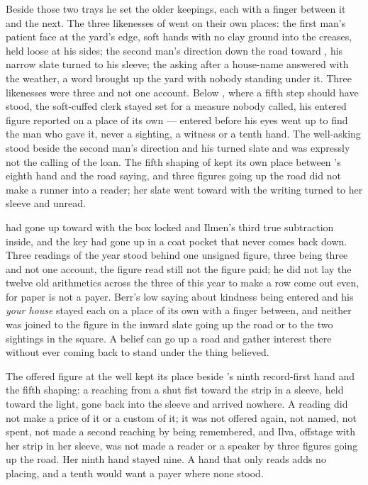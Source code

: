 Beside those two trays he set the older keepings, each with a finger between it and the next. The three likenesses of  went on their own places: the first man's patient face at the yard's edge, soft hands with no clay ground into the creases, held loose at his sides; the second man's direction down the road toward , his narrow slate turned to his sleeve; the asking after a house-name answered with the weather, a word brought up the yard with nobody standing under it. Three likenesses were three and not one account. Below , where a fifth step should have stood, the soft-cuffed clerk stayed set for a measure nobody called, his entered figure reported on a place of its own --- entered before his eyes went up to find the man who gave it, never a sighting, a witness or a tenth hand. The well-asking stood beside the second man's direction and his turned slate and was expressly not the calling of the loan. The fifth shaping of  kept its own place between 's eighth hand and the road saying, and three figures going up the road did not make a runner into a reader; her slate went toward  with the writing turned to her sleeve and unread.

 had gone up  toward  with the box locked and Ilmen's third true subtraction inside, and the key had gone up in a coat pocket that never comes back down. Three readings of the year stood behind one unsigned figure, three being three and not one account, the figure read still not the figure paid; he did not lay the twelve old arithmetics across the three of this year to make a row come out even, for paper is not a payer. Berr's low saying about kindness being entered and his \emph{your house} stayed each on a place of its own with a finger between, and neither was joined to the figure in the inward slate going up the road or to the two sightings in the square. A belief can go up a road and gather interest there without ever coming back to stand under the thing believed.

The offered figure at the well kept its place beside 's ninth record-first hand and the fifth shaping: a reaching from a shut fist toward the strip in a sleeve, held toward the light, gone back into the sleeve and arrived nowhere. A reading did not make a price of it or a custom of it; it was not offered again, not named, not spent, not made a second reaching by being remembered, and Ilva, offstage with her strip in her sleeve, was not made a reader or a speaker by three figures going up the road. Her ninth hand stayed nine. A hand that only reads adds no placing, and a tenth would want a payer where none stood.

